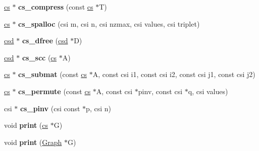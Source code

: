 \begin{DoxyCompactItemize}
\hyperlink{struct_mongoose_1_1cs__sparse}{cs} $\ast$ {\bfseries cs\+\_\+compress} (const \hyperlink{struct_mongoose_1_1cs__sparse}{cs} $\ast$T)
\item 
\hypertarget{namespace_mongoose_a0fa999ba128bf47a2d3e850902632ee0}{}\label{namespace_mongoose_a0fa999ba128bf47a2d3e850902632ee0} 
\hyperlink{struct_mongoose_1_1cs__sparse}{cs} $\ast$ {\bfseries cs\+\_\+spalloc} (csi m, csi n, csi nzmax, csi values, csi triplet)
\item 
\hypertarget{namespace_mongoose_af890f3acd5e9c91d56db604c9588ac75}{}\label{namespace_mongoose_af890f3acd5e9c91d56db604c9588ac75} 
\hyperlink{struct_mongoose_1_1cs__dmperm__results}{csd} $\ast$ {\bfseries cs\+\_\+dfree} (\hyperlink{struct_mongoose_1_1cs__dmperm__results}{csd} $\ast$D)
\item 
\hypertarget{namespace_mongoose_ae7a5086f0e92053c57ee14e6983a6864}{}\label{namespace_mongoose_ae7a5086f0e92053c57ee14e6983a6864} 
\hyperlink{struct_mongoose_1_1cs__dmperm__results}{csd} $\ast$ {\bfseries cs\+\_\+scc} (\hyperlink{struct_mongoose_1_1cs__sparse}{cs} $\ast$A)
\item 
\hypertarget{namespace_mongoose_af1b3fa2cdde0640c61538248856248f1}{}\label{namespace_mongoose_af1b3fa2cdde0640c61538248856248f1} 
\hyperlink{struct_mongoose_1_1cs__sparse}{cs} $\ast$ {\bfseries cs\+\_\+submat} (const \hyperlink{struct_mongoose_1_1cs__sparse}{cs} $\ast$A, const csi i1, const csi i2, const csi j1, const csi j2)
\item 
\hypertarget{namespace_mongoose_af26cb6523bce1312c41c05aa81682451}{}\label{namespace_mongoose_af26cb6523bce1312c41c05aa81682451} 
\hyperlink{struct_mongoose_1_1cs__sparse}{cs} $\ast$ {\bfseries cs\+\_\+permute} (const \hyperlink{struct_mongoose_1_1cs__sparse}{cs} $\ast$A, const csi $\ast$pinv, const csi $\ast$q, csi values)
\item 
\hypertarget{namespace_mongoose_acf53ac9514abcb8d1775ee586bd5c331}{}\label{namespace_mongoose_acf53ac9514abcb8d1775ee586bd5c331} 
csi $\ast$ {\bfseries cs\+\_\+pinv} (csi const $\ast$p, csi n)
\item 
\hypertarget{namespace_mongoose_a7595a65b084413408f4a67b324d69eb8}{}\label{namespace_mongoose_a7595a65b084413408f4a67b324d69eb8} 
void {\bfseries print} (\hyperlink{struct_mongoose_1_1cs__sparse}{cs} $\ast$G)
\item 
\hypertarget{namespace_mongoose_af395e653d0b0b5e7d255865bdf29dce5}{}\label{namespace_mongoose_af395e653d0b0b5e7d255865bdf29dce5} 
void {\bfseries print} (\hyperlink{class_mongoose_1_1_graph}{Graph} $\ast$G)

\end{DoxyCompactItemize}

